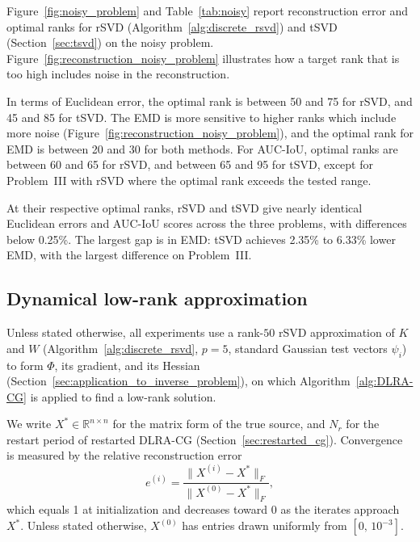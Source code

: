 Figure~\ref{fig:noisy_problem} and Table~\ref{tab:noisy} report reconstruction error and optimal ranks for rSVD (Algorithm~\ref{alg:discrete_rsvd}) and tSVD (Section~\ref{sec:tsvd}) on the noisy problem. Figure~\ref{fig:reconstruction_noisy_problem} illustrates how a target rank that is too high includes noise in the reconstruction.

In terms of Euclidean error, the optimal rank is between 50 and 75 for rSVD, and 45 and 85 for tSVD. The EMD is more sensitive to higher ranks which include more noise (Figure~\ref{fig:reconstruction_noisy_problem}), and the optimal rank for EMD is between 20 and 30 for both methods. For AUC-IoU, optimal ranks are between 60 and 65 for rSVD, and between 65 and 95 for tSVD, except for Problem~III with rSVD where the optimal rank exceeds the tested range.

At their respective optimal ranks, rSVD and tSVD give nearly identical Euclidean errors and AUC-IoU scores across the three problems, with differences below 0.25\%. The largest gap is in EMD: tSVD achieves 2.35\% to 6.33\% lower EMD, with the largest difference on Problem~III.
\FloatBarrier

\subsection{Dynamical low-rank approximation}
Unless stated otherwise, all experiments use a rank-$50$ rSVD approximation of $K$ and $W$ (Algorithm~\ref{alg:discrete_rsvd}, $p = 5$, standard Gaussian test vectors $\psi_i$) to form $\Phi$, its gradient, and its Hessian (Section~\ref{sec:application_to_inverse_problem}), on which Algorithm~\ref{alg:DLRA-CG} is applied to find a low-rank solution.

We write $X^* \in \mathbb{R}^{n \times n}$ for the matrix form of the true source, and $N_r$ for the restart period of restarted DLRA-CG (Section~\ref{sec:restarted_cg}). Convergence is measured by the relative reconstruction error
\begin{equation*}
    e^{(i)} = \frac{\|X^{(i)} - X^*\|_F}{\|X^{(0)} - X^*\|_F},
\end{equation*}
which equals 1 at initialization and decreases toward 0 as the iterates approach $X^*$. Unless stated otherwise, $X^{(0)}$ has entries drawn uniformly from $[0,\,10^{-3}]$.


